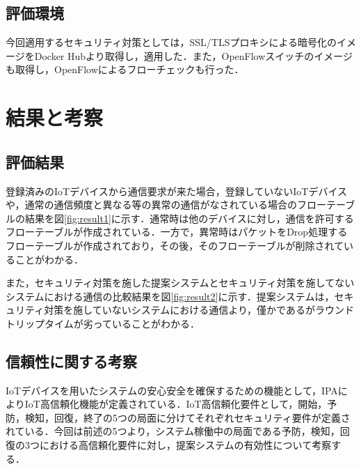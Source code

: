 \documentclass[Japanese]{dicomopapers}
\begin{document}
\subsection{評価環境}
今回適用するセキュリティ対策としては，SSL/TLSプロキシによる暗号化のイメージをDocker Hubより取得し，適用した．また，OpenFlowスイッチのイメージも取得し，OpenFlowによるフローチェックも行った．

\section{結果と考察}



\subsection{評価結果}
登録済みのIoTデバイスから通信要求が来た場合，登録していないIoTデバイスや，通常の通信頻度と異なる等の異常の通信がなされている場合のフローテーブルの結果を図\ref{fig:result1}に示す．通常時は他のデバイスに対し，通信を許可するフローテーブルが作成されている．一方で，異常時はパケットをDrop処理するフローテーブルが作成されており，その後，そのフローテーブルが削除されていることがわかる．\par
また，セキュリティ対策を施した提案システムとセキュリティ対策を施してないシステムにおける通信の比較結果を図\ref{fig:result2}に示す．提案システムは，セキュリティ対策を施していないシステムにおける通信より，僅かであるがラウンドトリップタイムが劣っていることがわかる．

\subsection{信頼性に関する考察}
IoTデバイスを用いたシステムの安心安全を確保するための機能として，IPAによりIoT高信頼化機能が定義されている．IoT高信頼化要件として，開始，予防，検知，回復，終了の5つの局面に分けてそれぞれセキュリティ要件が定義されている\cite{IPA}．今回は前述の5つより，システム稼働中の局面である予防，検知，回復の3つにおける高信頼化要件に対し，提案システムの有効性について考察する．
\end{document}
